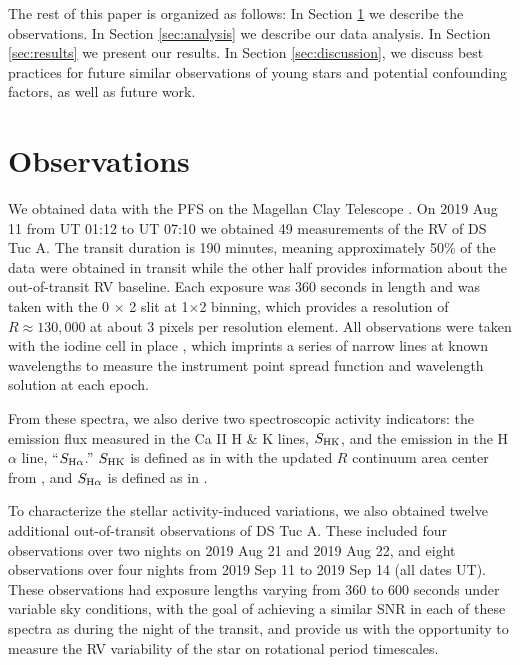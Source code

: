 \documentclass[twocolumn]{aastex63}
\begin{document}
The rest of this paper is organized as follows:
In Section \ref{sec:obs} we describe the observations.
In Section \ref{sec:analysis} we describe our data analysis.
In Section \ref{sec:results} we present our results.
In Section \ref{sec:discussion}, we discuss best practices for future similar observations of young stars and potential confounding factors, as well as future work.


\section{Observations}
\label{sec:obs}

We obtained data with the PFS on the Magellan Clay Telescope \citep{Crane06, Crane08, Crane10}. 
On 2019 Aug 11 from UT 01:12 to UT 07:10 we obtained 49 measurements of the RV of DS Tuc A. 
The transit duration is 190 minutes, meaning approximately 50\% of the data were obtained in transit while the other half provides information about the out-of-transit RV baseline. Each exposure was 360 seconds in length and was taken with the 0 $\times$ 2 slit at 1$\times$2 binning, which provides a resolution of $R \approx 130,000$ at about 3 pixels per resolution element. All observations were taken with the iodine cell in place \citep{Marcy92}, which imprints a series of narrow lines at known wavelengths to measure the instrument point spread function and wavelength solution at each epoch.

From these spectra, we also derive two spectroscopic activity indicators: the emission flux measured in the Ca \textsc{II} H \& K lines, $S_{\rm HK}$, and the emission in the H$\alpha$ line, ``$S_{\rm H\alpha}$.'' $S_{\rm HK}$ is defined as in \cite{duncan1991} with the updated $R$ continuum area center from \cite{santos2000}, and $S_{\rm H\alpha}$ is defined as in \cite{gomesdasilva2011}.

To characterize the stellar activity-induced variations, we also obtained twelve additional out-of-transit observations of DS Tuc A. These included four observations over two nights on 2019 Aug 21 and 2019 Aug 22, and eight observations over four nights from 2019 Sep 11 to 2019 Sep 14 (all dates UT).
These observations had exposure lengths varying from 360 to 600 seconds under variable sky conditions, with the goal of achieving a similar SNR in each of these spectra as during the night of the transit, and provide us with the opportunity to measure the RV variability of the star on rotational period timescales.
\end{document}
